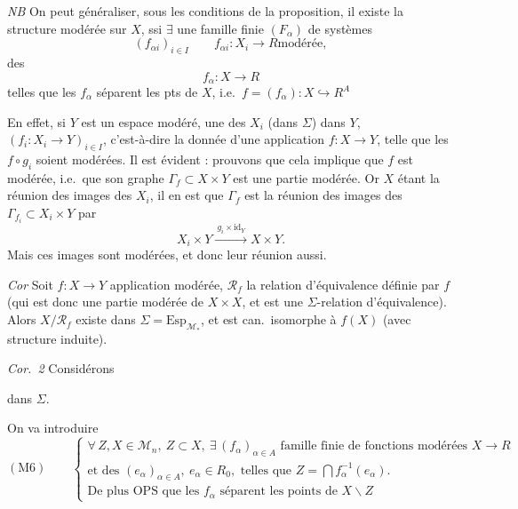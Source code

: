 \documentclass[11pt,a4paper]{article}
\begin{document}
\emph{NB} On peut généraliser, sous les conditions de la proposition, il
existe la structure modérée  sur $X$, ssi $\exists$ une
famille finie $(F_\alpha)$ \ill{} de systèmes 
\[ (f_{\alpha i})_{i \in I} \qquad f_{\alpha i} : X_i \to R \text{
modérée} , \]
 des
\[ f_\alpha : X \to R \]
telles que les $f_\alpha$ séparent les pts de $X$, i.e.\ $f = (f_\alpha) : X
\hookrightarrow R^A$

En effet, si $Y$ est un espace modéré, une 
\ill{} des   $X_i$ (dans $\Sigma$)
dans $Y$, $(f_i : X_i \to Y)_{i \in I}$, c'est-à-dire la donnée d'une
application $f : X \to Y$, telle que les $f \circ g_i$ soient modérées. Il
est évident : prouvons que cela implique que $f$ est modérée, i.e.\ que son
graphe $\Gamma_f \subset X \times Y$ est une partie modérée. Or $X$ étant la
réunion des images des $X_i$, il en est que $\Gamma_f$ est la réunion des
images des $\Gamma_{f_i} \subset X_i \times Y$ par
\[ X_i \times Y \xrightarrow{\ g_i \times \mathrm{id}_Y\ } X \times Y . \]
Mais ces images sont modérées, et donc leur réunion aussi.

\emph{Cor} Soit $f : X \to Y$ application modérée, $\mathcal{R}_f$ la relation
d'équivalence définie par $f$ (qui est donc une partie modérée de $X \times
X$, et est une $\Sigma$-relation d'équivalence). Alors $X / \mathcal{R}_f$
existe dans $\Sigma = \mathrm{Esp}_{\mathcal{M}_*}$, et est can.\ isomorphe
à $f(X)$ (avec structure induite).

\emph{Cor.\ 2} Considérons


dans $\Sigma$.

On va introduire
\[ (\mathrm{M}6) \qquad \begin{cases}
\forall\, Z, X \in \mathcal{M}_n,\ Z \subset X,\ \exists\,
(f_\alpha)_{\alpha \in A} \text{ famille finie de fonctions modérées } X \to
R \\
\text{et des } (e_\alpha)_{\alpha \in A},\ e_\alpha \in R_0, \text{ telles
que } Z = \bigcap f_\alpha^{-1}(e_\alpha) . \\
\text{De plus OPS que les } f_\alpha \text{ séparent les points de } X
\smallsetminus Z
\end{cases} \]
\end{document}
